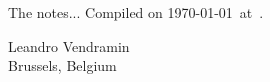 The notes...
\medskip
Compiled on \today~at~\currenttime.

\begin{flushright}
Leandro Vendramin\\Brussels, Belgium\par
\end{flushright}